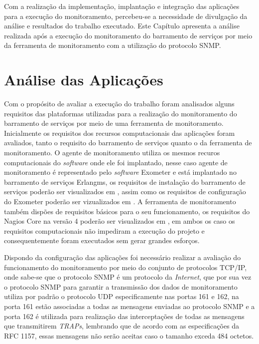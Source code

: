 \label{analise_monitoramento_servicos}

Com a realização da implementação, implantação e integração das aplicações para a execução do monitoramento, percebeu-se a necessidade de divulgação da análise e resultados do trabalho executado. Este Capítulo apresenta a análise realizada após a execução do monitoramento do barramento de serviços por meio da ferramenta de monitoramento com a utilização do protocolo \acrshort{SNMP}.


\section{Análise das Aplicações}
\label{analise}
Com o propósito de avaliar a execução do trabalho foram analisados alguns requisitos das plataformas utilizadas para a realização do monitoramento do barramento de serviços por meio de uma ferramenta de monitoramento. Inicialmente os requisitos dos recursos computacionais das aplicações foram avaliados, tanto o requisito do barramento de serviços quanto o da ferramenta de monitoramento. O agente de monitoramento utiliza os mesmos recuros computacionais do \textit{software} onde ele foi implantado, nesse caso agente de monitoramento é representado pelo \textit{software} Exometer e está implantado no barramento de serviços Erlangms, os requisitos de instalação do barramento de serviços poderão ser visualizados em \cite{erlangms_gitHub}, assim como os requisitos de configuração do Exometer poderão ser vizualizados em \cite{exometer_gitHub} . A ferramenta de monitoramento também dispões de requisitos básicos para o seu funcionamento, os requisitos do Nagios Core\textsuperscript{\textregistered} na versão 4 poderão ser visualizados em \cite{nagios_core_configuration}, em ambos os caso os requisitos computacionais não impediram a execução do projeto e consequentemente foram executados sem gerar grandes esforços.

Dispondo da configuração das aplicações foi necessário realizar a avaliação do funcionamento do monitoramento por meio do conjunto de protocolos TCP/IP, onde sabe-se que o protocolo \acrshort{SNMP} é um protocolo da \textit{Internet}, que por sua vez o protocolo \acrshort{SNMP} para garantir a transmissão dos dados de monitoramento utiliza por padrão o protocolo UDP especificamente nas portas 161 e 162, na porta 161 estão associadas a todas as mensagens enviadas ao protocolo \acrshort{SNMP} e a porta 162 é utilizada para realização das interceptações de todas as mensagens que transmitirem \textit{TRAPs}, lembrando que de acordo com as especificações da RFC 1157, essas mensagens não serão aceitas caso o tamanho exceda 484 octetos\cite{Schoffstall}. 

